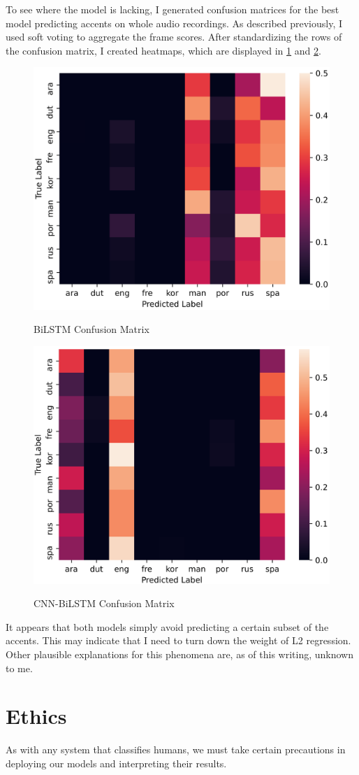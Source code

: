 \documentclass[11pt,a4paper]{article}
\begin{document}
To see where the model is lacking, I generated confusion matrices for the best model predicting accents on whole audio recordings. As described previously, I used soft voting to aggregate the frame scores. After standardizing the rows of the confusion matrix, I created heatmaps, which are displayed in \cref{fig:bilstm_heat} and \cref{fig:cnn_bilstm_heat}.
\begin{figure}[H]
  \centering
  \caption{BiLSTM Confusion Matrix}
  \includegraphics[width=.48\textwidth]{bilstm_heat.png}
  \label{fig:bilstm_heat}
\end{figure}
\begin{figure}[H]
  \centering
  \caption{CNN-BiLSTM Confusion Matrix}
  \includegraphics[width=.48\textwidth]{cnn_bilstm_heat.png}
  \label{fig:cnn_bilstm_heat}
\end{figure}

It appears that both models simply avoid predicting a certain subset of the accents. This may indicate that I need to turn down the weight of L2 regression. Other plausible explanations for this phenomena are, as of this writing, unknown to me.

\section{Ethics} \label{sec:ethics}

As with any system that classifies humans, we must take certain precautions in deploying our models and interpreting their results.
\end{document}
